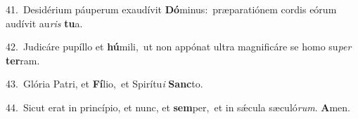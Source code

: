 {\numbfont\textcolor{\numbcolor}{41.}}~Desidérium páuperum exaudívit \textbf{Dó}\-minus:~\star præparatiónem cordis eórum audívit au\textit{ris} \textbf{tu}\-a.\par
{\numbfont\textcolor{\numbcolor}{42.}}~Judicáre pupíllo et \textbf{hú}\-mili,~\star ut non appónat ultra magnificáre se homo su\textit{per} \textbf{ter}\-ram.\par
{\numbfont\textcolor{\numbcolor}{43.}}~Glória Patri, et \textbf{Fí}\-lio,~\star et Spirítu\textit{i} \textbf{Sanc}\-to.\par
{\numbfont\textcolor{\numbcolor}{44.}}~Sicut erat in princípio, et nunc, et \textbf{sem}\-per,~\star et in sǽcula sæculó\-\textit{rum}\-. \textbf{A}\-men.\par

